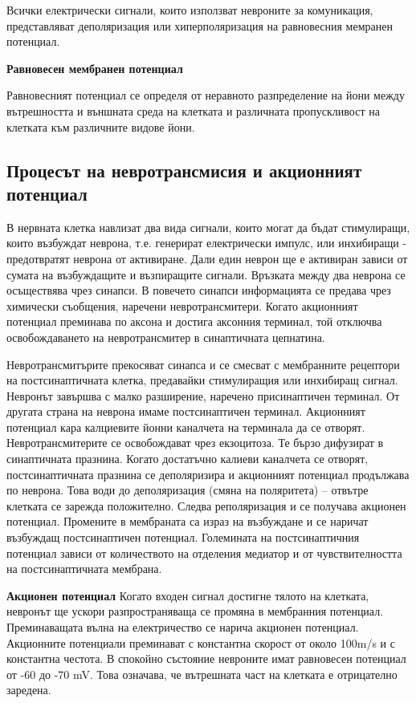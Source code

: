 \documentclass{article}
\begin{document}
Всички електрически сигнали, които използват невроните за комуникация, представляват деполяризация или хиперполяризация на равновесния мемранен потенциал.

\vspace{5mm} %
\textbf{Равновесен мембранен потенциал}

Равновесният потенциал се определя от неравното разпределение на йони между вътрешността и външната среда на клетката и различната пропускливост на клетката към различните видове йони.


\vspace{5mm} %
\subsection{Процесът на невротрансмисия и акционният потенциал}
В нервната клетка навлизат два вида сигнали, които могат да бъдат стимулиращи, които възбуждат неврона, т.е. генерират електрически импулс, или инхибиращи - предотвратят неврона от активиране.  Дали един неврон ще е активиран зависи от сумата на възбуждащите и възпиращите сигнали.
Връзката между два неврона се осъществява чрез синапси. В повечето синапси информацията се предава чрез химически съобщения, наречени невротрансмитери. Когато акционният потенциал преминава по аксона и достига аксонния терминал, той отключва освобождаването на невротрансмитер в синаптичната цепнатина.

Невротрансмитърите прекосяват синапса и се смесват с мембранните рецептори на постсинаптичната клетка, предавайки стимулиращия или инхибиращ сигнал. Невронът завършва с малко разширение, наречено присинаптичен терминал. От другата страна на неврона имаме постсинаптичен терминал. Акционният потенциал кара калциевите йонни каналчета на терминала да се отворят. Невротрансмитерите се освобождават чрез екзоцитоза. Те бързо дифузират в синаптичната празнина. Когато достатъчно калиеви каналчета се отворят, постсинаптичната празнина се деполяризира и акционният потенциал продължава по неврона. Това води до деполяризация (смяна на поляритета) -- отвътре клетката се зарежда положително. Следва реполяризация и се получава акционен потенциал. Промените в мембраната  са израз на възбуждане и се наричат възбуждащ постсинаптичен потенциал. Големината на постсинаптичния потенциал зависи от количеството на отделения медиатор и от чувствителността на постсинаптичната мембрана.

\vspace{5mm} %
\textbf{Акционен потенциал}
Когато входен сигнал достигне тялото на клетката, невронът ще ускори разпространяваща се промяна в мембранния потенциал. Преминаващата вълна на електричество се нарича акционен потенциал. Акционните потенциали преминават с константна скорост от около 100m/s и с константна честота. 
В спокойно състояние невроните имат равновесен потенциал от -60 до -70 mV. Това означава, че вътрешната част на клетката е отрицателно заредена.
\end{document}
